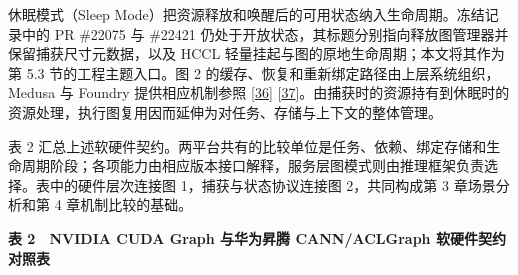 \documentclass[UTF8,10.5pt,fontset=windows]{ctexart}
\newcommand{\TableTitle}[1]{\par\Needspace{5\baselineskip}\begingroup\centering\bfseries\fontsize{9.5}{13}\selectfont #1\par\endgroup\nobreak}
\begin{document}
休眠模式（Sleep
Mode）把资源释放和唤醒后的可用状态纳入生命周期。冻结记录中的 PR \#22075
与 \#22421
仍处于开放状态，其标题分别指向释放图管理器并保留捕获尺寸元数据，以及
HCCL 轻量挂起与图的原地生命周期；本文将其作为第 5.3 节的工程主题入口。图
2 的缓存、恢复和重新绑定路径由上层系统组织，Medusa 与 Foundry
提供相应机制参照 {[}\protect\hyperlink{ref-zeng2025medusa}{36}{]}
{[}\protect\hyperlink{ref-liu2026foundry}{37}{]}。由捕获时的资源持有到休眠时的资源处理，执行图复用因而延伸为对任务、存储与上下文的整体管理。

表 2
汇总上述软硬件契约。两平台共有的比较单位是任务、依赖、绑定存储和生命周期阶段；各项能力由相应版本接口解释，服务层图模式则由推理框架负责选择。表中的硬件层次连接图
1，捕获与状态协议连接图 2，共同构成第 3 章场景分析和第 4
章机制比较的基础。

\begingroup
\fontsize{8.6}{11.8}\selectfont
\setlength{\tabcolsep}{2.5pt}
\setlength{\emergencystretch}{0.5\linewidth}
\renewcommand{\arraystretch}{1.10}
\TableTitle{\textbf{表 2　NVIDIA CUDA Graph 与华为昇腾 CANN/ACLGraph
软硬件契约对照表}}
\end{document}
